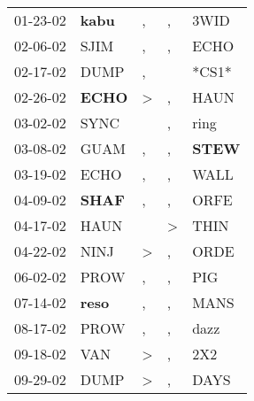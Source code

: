 \begin{supertabular}{p{0.07\textwidth}p{0.06\textwidth}p{0.02\textwidth}p{0.02\textwidth}p{0.06\textwidth}}
 01-23-02\textsuperscript{} &  \textbf{kabu\textsuperscript{}} &                , &             , &           3WID\textsuperscript{} \\
 02-06-02\textsuperscript{} &           SJIM\textsuperscript{} &                , &             , &           ECHO\textsuperscript{} \\
 02-17-02\textsuperscript{} &           DUMP\textsuperscript{} &                , &               &                            *CS1* \\
 02-26-02\textsuperscript{} &  \textbf{ECHO\textsuperscript{}} &     \textgreater &             , &           HAUN\textsuperscript{} \\
 03-02-02\textsuperscript{} &           SYNC\textsuperscript{} &                  &             , &           ring\textsuperscript{} \\
 03-08-02\textsuperscript{} &           GUAM\textsuperscript{} &                , &             , &  \textbf{STEW\textsuperscript{}} \\
 03-19-02\textsuperscript{} &           ECHO\textsuperscript{} &                , &             , &           WALL\textsuperscript{} \\
 04-09-02\textsuperscript{} &  \textbf{SHAF\textsuperscript{}} &                , &             , &           ORFE\textsuperscript{} \\
 04-17-02\textsuperscript{} &           HAUN\textsuperscript{} &                  &  \textgreater &           THIN\textsuperscript{} \\
 04-22-02\textsuperscript{} &           NINJ\textsuperscript{} &     \textgreater &             , &           ORDE\textsuperscript{} \\
 06-02-02\textsuperscript{} &           PROW\textsuperscript{} &                , &             , &            PIG\textsuperscript{} \\
 07-14-02\textsuperscript{} &  \textbf{reso\textsuperscript{}} &                , &             , &           MANS\textsuperscript{} \\
 08-17-02\textsuperscript{} &           PROW\textsuperscript{} &                , &             , &           dazz\textsuperscript{} \\
 09-18-02\textsuperscript{} &            VAN\textsuperscript{} &     \textgreater &             , &            2X2\textsuperscript{} \\
 09-29-02\textsuperscript{} &           DUMP\textsuperscript{} &     \textgreater &             , &           DAYS\textsuperscript{} \\

\end{supertabular}
